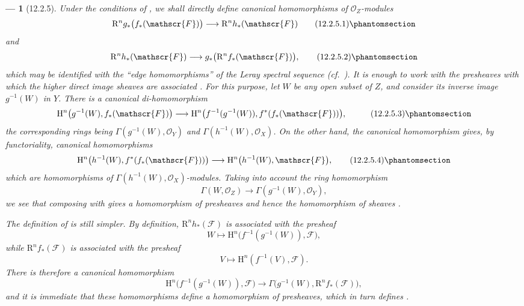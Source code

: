 \documentclass[oneside]{amsart}
\theoremstyle{ega-env-style}
\newtheorem*{env}{---}
\theoremstyle{ega-thm-env-style}
\theoremstyle{ega-defn-env-style}
\def\mathcal{\mathscr}
\def\sh{\mathcal}                   %
\def\HH{\mathrm{H}}                 %
\def\RR{\mathrm{R}}                 %
\newcommand{\oldpage}[2][]{{\marginnote{\normalfont{\textbf{#1}~|~#2}}}\ignorespaces}
\let\EGAOriginalLabel\label
\renewcommand{\label}[1]{\phantomsection\EGAOriginalLabel{#1}}
\begin{document}
\begin{env}[12.2.5]
\label{0.12.2.5}
Under the conditions of , we shall directly define
canonical homomorphisms of $\sh{O}_Z$-modules
\[
  \RR^n g_*\bigl(f_*(\sh{F})\bigr)
  \longrightarrow\RR^n h_*(\sh{F})
  \tag{12.2.5.1}
  \label{0.12.2.5.1}
\]
and
\[
  \RR^n h_*(\sh{F})
  \longrightarrow g_*\bigl(\RR^n f_*(\sh{F})\bigr),
  \tag{12.2.5.2}
  \label{0.12.2.5.2}
\]
\oldpage[0\textsubscript{III}]{59}
which may be identified with the ``edge homomorphisms'' of the Leray
spectral sequence (cf.\ ).
It is enough to work with the presheaves with which the higher direct
image sheaves are associated .
For this purpose, let $W$ be any open subset of $Z$, and consider its
inverse image $g^{-1}(W)$ in $Y$.  There is a canonical
di-homomorphism
\[
  \begin{aligned}
  \HH^n\bigl(g^{-1}(W),f_*(\sh{F})\bigr)
  &\longrightarrow
  \HH^n\bigl(f^{-1}(g^{-1}(W)),
    f^*(f_*(\sh{F}))\bigr),
  \end{aligned}
  \tag{12.2.5.3}
  \label{0.12.2.5.3}
\]
the corresponding rings being
$\Gamma(g^{-1}(W),\sh{O}_Y)$ and
$\Gamma(h^{-1}(W),\sh{O}_X)$.
On the other hand, the canonical homomorphism
 gives, by functoriality,
canonical homomorphisms
\[
  \HH^n\bigl(h^{-1}(W),f^*(f_*(\sh{F}))\bigr)
  \longrightarrow
  \HH^n\bigl(h^{-1}(W),\sh{F}\bigr),
  \tag{12.2.5.4}
  \label{0.12.2.5.4}
\]
which are homomorphisms of
$\Gamma(h^{-1}(W),\sh{O}_X)$-modules.
Taking into account the ring homomorphism
\[
  \Gamma(W,\sh{O}_Z)
  \longrightarrow\Gamma(g^{-1}(W),\sh{O}_Y),
\]
we see that composing  with
 gives a homomorphism of presheaves and hence the
homomorphism of sheaves .

The definition of  is still simpler.
By definition, $\RR^n h_*(\sh{F})$ is associated with the presheaf
\[
  W\longmapsto
  \HH^n\bigl(f^{-1}(g^{-1}(W)),\sh{F}\bigr),
\]
while $\RR^n f_*(\sh{F})$ is associated with the presheaf
\[
  V\longmapsto\HH^n(f^{-1}(V),\sh{F}).
\]
There is therefore a canonical homomorphism
\[
  \HH^n\bigl(f^{-1}(g^{-1}(W)),\sh{F}\bigr)
  \longrightarrow
  \Gamma\bigl(g^{-1}(W),\RR^n f_*(\sh{F})\bigr),
\]
and it is immediate that these homomorphisms define a homomorphism of
presheaves, which in turn defines .
\end{env}
\end{document}
